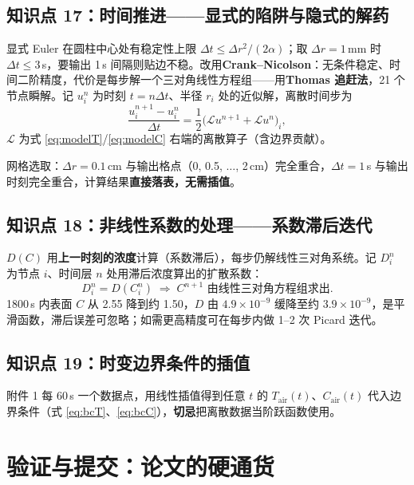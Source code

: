\documentclass[12pt,a4paper]{ctexart}
\begin{document}
\subsection{知识点 17：时间推进——显式的陷阱与隐式的解药}

显式 Euler 在圆柱中心处有稳定性上限 $\Delta t\le\Delta r^2/(2\alpha)$；取 $\Delta r=1$\,mm 时 $\Delta t\le3$\,s，要输出 1\,s 间隔则贴边不稳。改用\textbf{Crank--Nicolson}：无条件稳定、时间二阶精度，代价是每步解一个三对角线性方程组——用\textbf{Thomas 追赶法}，21 个节点瞬解。记 $u_i^n$ 为时刻 $t=n\Delta t$、半径 $r_i$ 处的近似解，离散时间步为
\begin{equation}
\frac{u^{n+1}_i-u_i^n}{\Delta t}=\frac12\big(\mathcal{L}u^{n+1}+\mathcal{L}u^n\big)_i,
\end{equation}
$\mathcal{L}$ 为式 \eqref{eq:modelT}/\eqref{eq:modelC} 右端的离散算子（含边界贡献）。

网格选取：$\Delta r=0.1$\,cm 与输出格点（0, 0.5, $\ldots$, 2\,cm）完全重合，$\Delta t=1$\,s 与输出时刻完全重合，计算结果\textbf{直接落表，无需插值}。

\subsection{知识点 18：非线性系数的处理——系数滞后迭代}

$D(C)$ 用\textbf{上一时刻的浓度}计算（系数滞后），每步仍解线性三对角系统。记 $D_i^n$ 为节点 $i$、时间层 $n$ 处用滞后浓度算出的扩散系数：
\begin{equation}
D_i^n=D(C_i^n)\;\Longrightarrow\;C^{n+1}\text{ 由线性三对角方程组求出}.
\end{equation}
1800\,s 内表面 $C$ 从 2.55 降到约 1.50，$D$ 由 $4.9\times10^{-9}$ 缓降至约 $3.9\times10^{-9}$，是平滑函数，滞后误差可忽略；如需更高精度可在每步内做 1--2 次 Picard 迭代。

\subsection{知识点 19：时变边界条件的插值}

附件 1 每 60\,s 一个数据点，用线性插值得到任意 $t$ 的 $T_{\mathrm{air}}(t)$、$C_{\mathrm{air}}(t)$ 代入边界条件（式 \eqref{eq:bcT}、\eqref{eq:bcC}），\textbf{切忌}把离散数据当阶跃函数使用。

\section{验证与提交：论文的硬通货}
\end{document}
